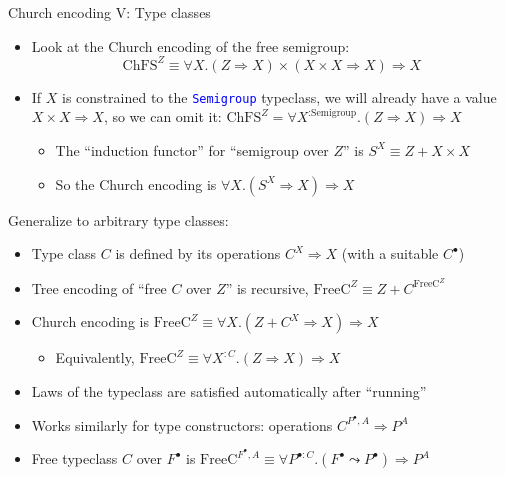 \documentclass[english,,russian]{beamer}
\begin{document}
\begin{frame}{Church encoding V: Type classes}
\begin{itemize}
\item Look at the Church encoding of the free semigroup:{\footnotesize{}
\[
\text{ChFS}^{Z}\equiv\forall X.\left(Z\Rightarrow X\right)\times\left(X\times X\Rightarrow X\right)\Rightarrow X
\]
}{\footnotesize\par}
\item If $X$ is constrained to the \texttt{\textcolor{blue}{\footnotesize{}Semigroup}}
typeclass, we will already have a value {\footnotesize{}$X\times X\Rightarrow X$},
so we can omit it: {\footnotesize{}$\text{ChFS}^{Z}=\forall X^{:\text{Semigroup}}.\left(Z\Rightarrow X\right)\Rightarrow X$}{\footnotesize\par}
\begin{itemize}
\item The ``induction functor'' for ``semigroup over $Z$'' is $S^{X}\equiv Z+X\times X$
\item So the Church encoding is $\forall X.\left(S^{X}\Rightarrow X\right)\Rightarrow X$
\end{itemize}
\end{itemize}
Generalize to arbitrary type classes:
\begin{itemize}
\item Type class $C$ is defined by its operations $C^{X}\Rightarrow X$
(with a suitable $C^{\bullet}$)
\item Tree encoding of ``free $C$ over $Z$'' is recursive, $\text{FreeC}^{Z}\equiv Z+C^{\text{FreeC}^{Z}}$
\item Church encoding is $\text{FreeC}^{Z}\equiv\forall X.\left(Z+C^{X}\Rightarrow X\right)\Rightarrow X$
\begin{itemize}
\item Equivalently, $\text{FreeC}^{Z}\equiv\forall X^{:C}.\left(Z\Rightarrow X\right)\Rightarrow X$
\end{itemize}
\item Laws of the typeclass are satisfied automatically after ``running''
\item Works similarly for type constructors: operations $C^{P^{\bullet},A}\Rightarrow P^{A}$
\item Free typeclass $C$ over $F^{\bullet}$ is $\text{FreeC}^{F^{\bullet},A}\equiv\forall P^{\bullet:C}.\left(F^{\bullet}\leadsto P^{\bullet}\right)\Rightarrow P^{A}$
\end{itemize}
\end{frame}
\end{document}
